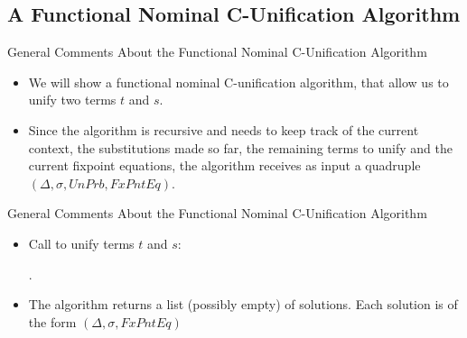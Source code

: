 \subsection{A Functional Nominal C-Unification Algorithm}

\begin{frame}{General Comments About the Functional Nominal C-Unification Algorithm}
\begin{itemize}
    \item We will show a functional nominal C-unification algorithm, that allow us to
    unify two terms $t$ and $s$.
    \item Since the algorithm is recursive and needs to keep track of the current context,
        the substitutions made so far, the remaining terms to unify and the current
        fixpoint equations, the algorithm receives as input a quadruple 
        $(\Delta, \sigma, UnPrb, FxPntEq)$.
\end{itemize}
\end{frame}

\begin{frame}{General Comments About the Functional Nominal C-Unification Algorithm}
\begin{itemize}
    \item Call to unify terms $t$ and $s$: 
    \begin{algorithmic}[1]
        .
    \end{algorithmic}
    \item The algorithm returns a list (possibly empty) of solutions. Each solution
        is of the form $(\Delta, \sigma, FxPntEq)$
\end{itemize}
\end{frame}

